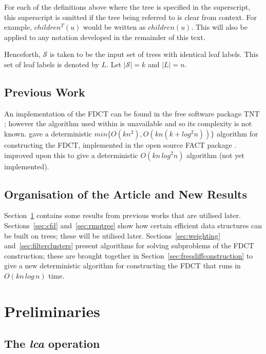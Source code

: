 \documentclass[12pt,a4paper]{article}
\begin{document}
    For each of the definitions above where the tree is specified in the superscript, this superscript is omitted if the tree being referred to is clear from context. For example, $children^T(u)$ would be written as $children(u)$. This will also be applied to any notation developed in the remainder of this text.

    Henceforth, $\mathcal{S}$ is taken to be the input set of trees with identical leaf labels. This set of leaf labels is denoted by $L$. Let $|\mathcal{S}| = k$ and $|L| = n$.

    \subsection{Previous Work}
    \label{subsec:previouswork}

    An implementation of the FDCT can be found in the free software package TNT \citep{goloboff2008tnt}; however the algorithm used within is unavailable and so its complexity is not known. \cite{jansson2018algorithms} gave a deterministic $min\{O(kn^2), O(kn(k + log^2 n))\}$ algorithm for constructing the FDCT, implemented in the open source FACT package \citep{jansson2016improved}. \cite{gawrychowski2017faster} improved upon this to give a deterministic $O(kn\,log^2n)$ algorithm (not yet implemented).

    \subsection{Organisation of the Article and New Results}
    Section~\ref{sec:preliminaries} contains some results from previous works that are utilised later. Sections~\ref{sec:cfd} and~\ref{sec:rmqtree} show how certain efficient data structures can be built on trees; these will be utilised later. Sections~\ref{sec:weighting} and~\ref{sec:filterclusters} present algorithms for solving subproblems of the FDCT construction; these are brought together in Section~\ref{sec:freqdiffconstruction} to give a new deterministic algorithm for constructing the FDCT that runs in $O(kn\,log\,n)$ time.

    \section{Preliminaries}
    \label{sec:preliminaries}

    \subsection{The \textit{lca} operation}
\end{document}

